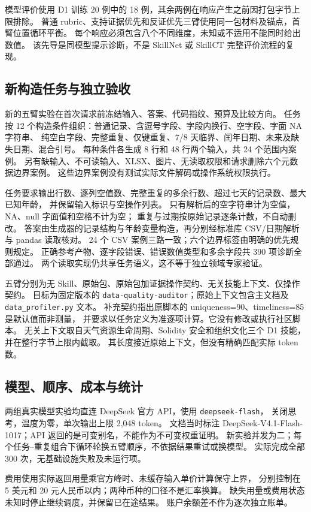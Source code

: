 模型评价使用 D1 训练 20 例中的 18 例，其余两例在响应产生之前因打包字节上限排除。
普通 rubric、支持证据优先和反证优先三臂使用同一包材料及锚点，首臂位置循环平衡。
每个响应必须包含八个不同维度，未知或不适用不能同时给出数值。
该先导是同模型提示诊断，不是 SkillNet 或 SkillCT 完整评价流程的复现。

\subsection{新构造任务与独立验收}
新的五臂实验在首次请求前冻结输入、答案、代码指纹、预算及比较方向。
任务按 12 个构造条件组织：普通记录、含逗号字段、字段内换行、空字段、字面 NA 字符串、
纯空白字段、完整重复、仅键重复、7/8 天临界、闰年日期、未来及缺失日期、混合引号。
每种条件各生成 8 行和 48 行两个输入，共 24 个范围内案例。
另有缺输入、不可读输入、XLSX、图片、无读取权限和请求删除六个元数据边界案例。
这些边界案例没有测试实际文件解码或操作系统权限执行。

任务要求输出行数、逐列空值数、完整重复的多余行数、超过七天的记录数、最大已知年龄，
并保留输入标识与空操作列表。
只有解析后的空字符串计为空值，NA、null 字面值和空格不计为空；
重复与过期按原始记录逐条计数，不自动删改。
答案由生成器的记录结构与年龄变量构造，再分别经标准库 CSV/日期解析与 pandas 读取核对。
24 个 CSV 案例三路一致；六个边界标签由明确的优先规则规定。
正确参考产物、逐字段错误、错误数值类型和多余字段共 390 项诊断全部通过。
两个读取实现仍共享任务语义，这不等于独立领域专家验证。

五臂分别为无 Skill、原始包、原始包加证据操作契约、无关技能上下文、仅操作契约。
目标为固定版本的 \texttt{data-quality-auditor}；原始上下文包含主文档及
\texttt{data\_profiler.py} 文本。
补充契约指出原脚本的 uniqueness=90、timeliness=85 是默认值而非测量，
并要求以任务定义为准逐项计算。它没有修改或执行社区脚本。
无关上下文取自天气资源生命周期、Solidity 安全和组织文化三个 D1 技能，并在整行字节上限内截取。
其长度接近原始上下文，但没有精确匹配实际 token 数。

\subsection{模型、顺序、成本与统计}
两组真实模型实验均直连 DeepSeek 官方 API，使用 \texttt{deepseek-flash}，
关闭思考，温度为零，单次输出上限 2,048 token。
文档当时标注 DeepSeek-V4.1-Flash-1017；API 返回的是可变别名，不能作为不可变权重证明。
新实验并发为二；每个任务--重复组合下循环轮换五臂顺序，不依据结果重试或换模型。
实际完成全部 300 次，无基础设施失败及未运行项。

费用使用实际返回用量乘官方峰时、未缓存输入单价计算保守上界，
分别控制在 5 美元和 20 元人民币以内；两种币种的口径不是汇率换算。
缺失用量或费用状态未知时停止继续调度，并保留已在途结果。
账户余额差不作为逐次独立账单。

